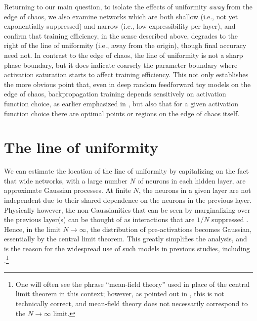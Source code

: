 Returning to our main question, to isolate the effects of uniformity \emph{away} from the edge of chaos, we also examine networks which are both shallow (i.e., not yet exponentially suppressed) and narrow (i.e., low expressibility per layer), and confirm that training efficiency, in the sense described above, degrades to the right of the line of uniformity (i.e., away from the origin), though final accuracy need not. In contrast to the edge of chaos, the line of uniformity is not a sharp phase boundary, but it does indicate coarsely the parameter boundary where activation saturation starts to affect training efficiency. This not only establishes the more obvious point that, even in deep random feedforward toy models on the edge of chaos, backpropagation training depends sensitively on activation function choice, as earlier emphasized in \cite{2018arXiv180508266H,pmlr-v97-hayou19a}, but also that for a given activation function choice there are optimal points or regions on the edge of chaos itself.

\section{The line of uniformity}
We can estimate the location of the line of uniformity by capitalizing on the fact that wide networks, with a large number $N$ of neurons in each hidden layer, are approximate Gaussian processes. At finite $N$, the neurons in a given layer are not independent due to their shared dependence on the neurons in the previous layer. Physically however, the non-Gaussianities that can be seen by marginalizing over the previous layer(s) can be thought of as interactions that are $1/N$ suppressed \cite{Roberts:2021fes,Grosvenor:2021eol}. Hence, in the limit $N\rightarrow\infty$, the distribution of pre-activations becomes Gaussian, essentially by the central limit theorem. This greatly simplifies the analysis, and is the reason for the widespread use of such models in previous studies, including \cite{2016arXiv161101232S}.\footnote{One will often see the phrase ``mean-field theory'' used in place of the central limit theorem in this context; however, as pointed out in \cite{Grosvenor:2021eol}, this is not technically correct, and mean-field theory does not necessarily correspond to the $N\rightarrow\infty$ limit.}

